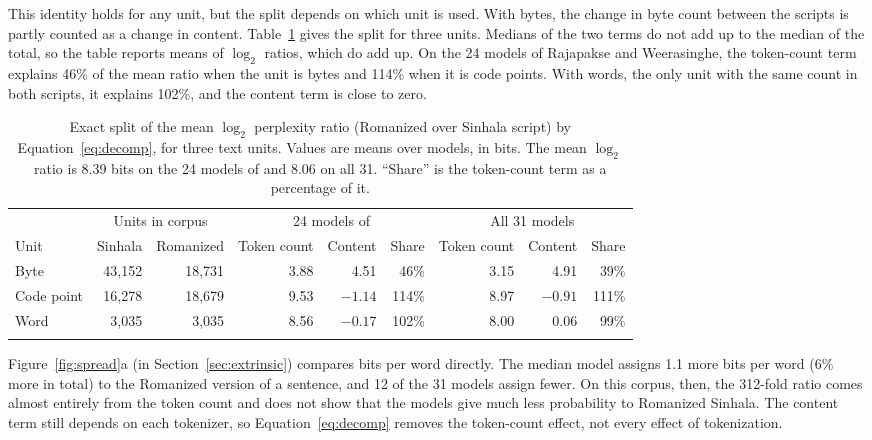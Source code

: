 \documentclass[3p,times,procedia]{elsarticle}
\begin{document}
This identity holds for any unit, but the split depends on which unit is used. With bytes, the change in byte count between the scripts is partly counted as a change in content. Table~\ref{tab:decomp} gives the split for three units. Medians of the two terms do not add up to the median of the total, so the table reports means of $\log_2$ ratios, which do add up. On the 24 models of Rajapakse and Weerasinghe, the token-count term explains 46\% of the mean ratio when the unit is bytes and 114\% when it is code points. With words, the only unit with the same count in both scripts, it explains 102\%, and the content term is close to zero.

\begin{table}[t]
\caption{Exact split of the mean $\log_2$ perplexity ratio (Romanized over Sinhala script) by Equation~\ref{eq:decomp}, for three text units. Values are means over models, in bits. The mean $\log_2$ ratio is 8.39 bits on the 24 models of \cite{rajapakse} and 8.06 on all 31. ``Share'' is the token-count term as a percentage of it.}
\label{tab:decomp}
\begin{tabular*}{\hsize}{@{\extracolsep{\fill}}lrrrrrrrr@{}}
\toprule
& \multicolumn{2}{c}{Units in corpus} & \multicolumn{3}{c}{24 models of \cite{rajapakse}} & \multicolumn{3}{c}{All 31 models} \\
\cline{2-3}\cline{4-6}\cline{7-9}
Unit & Sinhala & Romanized & Token count & Content & Share & Token count & Content & Share \\
\colrule
Byte & 43{,}152 & 18{,}731 & 3.88 & 4.51 & 46\% & 3.15 & 4.91 & 39\% \\
Code point & 16{,}278 & 18{,}679 & 9.53 & $-1.14$ & 114\% & 8.97 & $-0.91$ & 111\% \\
Word & 3{,}035 & 3{,}035 & 8.56 & $-0.17$ & 102\% & 8.00 & 0.06 & 99\% \\
\botrule
\end{tabular*}
\end{table}

Figure~\ref{fig:spread}a (in Section~\ref{sec:extrinsic}) compares bits per word directly. The median model assigns 1.1 more bits per word (6\% more in total) to the Romanized version of a sentence, and 12 of the 31 models assign fewer. On this corpus, then, the 312-fold ratio comes almost entirely from the token count and does not show that the models give much less probability to Romanized Sinhala. The content term still depends on each tokenizer, so Equation~\ref{eq:decomp} removes the token-count effect, not every effect of tokenization.
\end{document}
